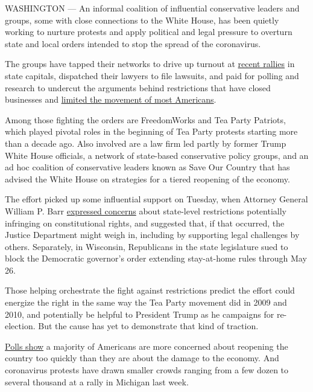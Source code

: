 WASHINGTON --- An informal coalition of influential conservative leaders
and groups, some with close connections to the White House, has been
quietly working to nurture protests and apply political and legal
pressure to overturn state and local orders intended to stop the spread
of the coronavirus.

The groups have tapped their networks to drive up turnout at
\href{https://www.nytimes.com/2020/04/18/us/texas-protests-stay-at-home.html}{recent
rallies} in state capitals, dispatched their lawyers to file lawsuits,
and paid for polling and research to undercut the arguments behind
restrictions that have closed businesses and
\href{https://www.nytimes.com/interactive/2020/us/coronavirus-stay-at-home-order.html}{limited
the movement of most Americans}.

Among those fighting the orders are FreedomWorks and Tea Party Patriots,
which played pivotal roles in the beginning of Tea Party protests
starting more than a decade ago. Also involved are a law firm led partly
by former Trump White House officials, a network of state-based
conservative policy groups, and an ad hoc coalition of conservative
leaders known as Save Our Country that has advised the White House on
strategies for a tiered reopening of the economy.

The effort picked up some influential support on Tuesday, when Attorney
General William P. Barr
\href{https://www.hughhewitt.com/attorney-general-william-barr-on-the-crisis/}{expressed
concerns} about state-level restrictions potentially infringing on
constitutional rights, and suggested that, if that occurred, the Justice
Department might weigh in, including by supporting legal challenges by
others. Separately, in Wisconsin, Republicans in the state legislature
sued to block the Democratic governor's order extending stay-at-home
rules through May 26.

Those helping orchestrate the fight against restrictions predict the
effort could energize the right in the same way the Tea Party movement
did in 2009 and 2010, and potentially be helpful to President Trump as
he campaigns for re-election. But the cause has yet to demonstrate that
kind of traction.

\href{https://www.nbcnews.com/politics/meet-the-press/poll-six-10-support-keeping-stay-home-restrictions-fight-coronavirus-n1187011}{Polls
show} a majority of Americans are more concerned about reopening the
country too quickly than they are about the damage to the economy. And
coronavirus protests have drawn smaller crowds ranging from a few dozen
to several thousand at a rally in Michigan last week.

